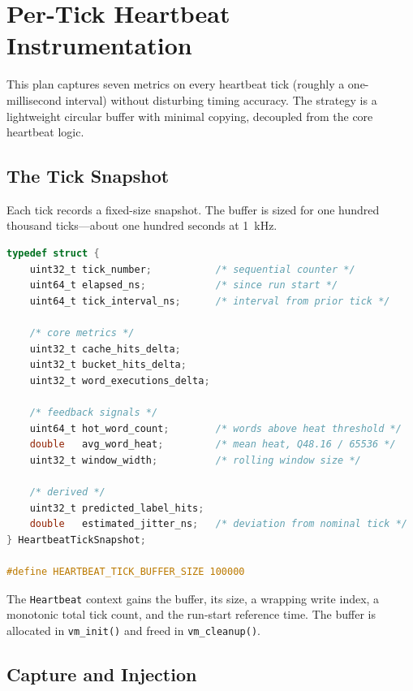 
\section{Per-Tick Heartbeat Instrumentation}

This plan captures seven metrics on every heartbeat tick (roughly a
one-millisecond interval) without disturbing timing accuracy. The strategy is a
lightweight circular buffer with minimal copying, decoupled from the core
heartbeat logic.

\subsection{The Tick Snapshot}

Each tick records a fixed-size snapshot. The buffer is sized for one hundred
thousand ticks---about one hundred seconds at 1~kHz.

\begin{lstlisting}[language=C]
typedef struct {
    uint32_t tick_number;           /* sequential counter */
    uint64_t elapsed_ns;            /* since run start */
    uint64_t tick_interval_ns;      /* interval from prior tick */

    /* core metrics */
    uint32_t cache_hits_delta;
    uint32_t bucket_hits_delta;
    uint32_t word_executions_delta;

    /* feedback signals */
    uint64_t hot_word_count;        /* words above heat threshold */
    double   avg_word_heat;         /* mean heat, Q48.16 / 65536 */
    uint32_t window_width;          /* rolling window size */

    /* derived */
    uint32_t predicted_label_hits;
    double   estimated_jitter_ns;   /* deviation from nominal tick */
} HeartbeatTickSnapshot;

#define HEARTBEAT_TICK_BUFFER_SIZE 100000
\end{lstlisting}

The \lstinline{Heartbeat} context gains the buffer, its size, a wrapping write
index, a monotonic total tick count, and the run-start reference time. The
buffer is allocated in \lstinline{vm_init()} and freed in
\lstinline{vm_cleanup()}.

\subsection{Capture and Injection}

